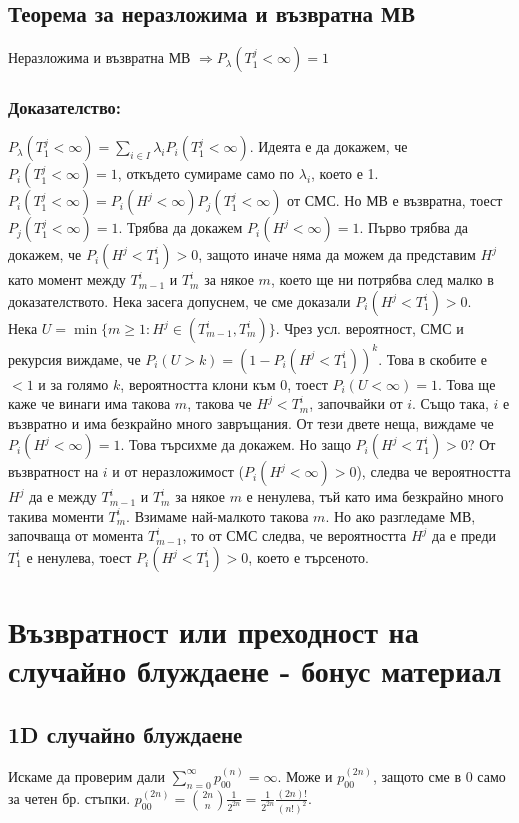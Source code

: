 \documentclass{article}
\begin{document}
\subsection{Теорема за неразложима и възвратна МВ}
Неразложима и възвратна МВ $\Rightarrow P_\lambda(T_1^j < \infty) = 1$

\subsubsection*{Доказателство:}
$P_\lambda(T_1^j < \infty) = \sum_{i \in I} \lambda_i P_i(T_1^j < \infty)$. Идеята е да докажем, че $P_i(T_1^j < \infty) = 1$, откъдето сумираме 
само по $\lambda_i$, което е 1. \\ $P_i(T_1^j < \infty) = P_i(H^j < \infty)P_j(T_1^j < \infty)$ от СМС. Но МВ е възвратна, тоест $P_j(T_1^j < \infty) = 1$. 
Трябва да докажем $P_i(H^j < \infty) = 1$. Първо трябва да докажем, че $P_i(H^j < T_1^i) > 0$, защото иначе 
няма да можем да представим $H^j$ като момент между $T_{m-1}^i$ и $T_m^i$ за някое $m$, което ще ни потрябва 
след малко в доказателството. Нека засега допуснем, че сме доказали $P_i(H^j < T_1^i) > 0$. \\
Нека $U = \min\{m \geq 1 : H^j \in (T_{m-1}^i, T_m^i)\}$. Чрез усл. вероятност, СМС и рекурсия виждаме, че 
$P_i(U > k) = (1 - P_i(H^j < T_1^i))^k$. Това в скобите е $<1$ и за голямо $k$, вероятността клони към 0, тоест $P_i(U < \infty) = 1$. 
Това ще каже че винаги има такова $m$, такова че $H^j < T_m^i$, започвайки от $i$. Също така, $i$ е възвратно 
и има безкрайно много завръщания. От тези двете неща, виждаме че $P_i(H^j < \infty) = 1$. Това търсихме да докажем. 
Но защо $P_i(H^j < T_1^i) > 0$? От възвратност на $i$ и от неразложимост ($P_i(H^j < \infty) > 0$), следва че вероятността 
$H^j$ да е между $T_{m-1}^i$ и $T_m^i$ за някое $m$ е ненулева, тъй като има безкрайно много такива моменти $T_m^i$.  
Взимаме най-малкото такова $m$. Но ако разгледаме МВ, започваща от момента $T_{m-1}^i$, то от СМС следва, 
че вероятността $H^j$ да е преди $T_1^i$ е ненулева, тоест $P_i(H^j < T_1^i) > 0$, което е търсеното.

\section{Възвратност или преходност на случайно блуждаене - бонус материал}

\subsection{1D случайно блуждаене}
Искаме да проверим дали $\sum_{n=0}^\infty p_{00}^{(n)} = \infty$. Може и $p_{00}^{(2n)}$, защото сме 
в 0 само за четен бр. стъпки. $p_{00}^{(2n)} = \binom{2n}{n}\frac{1}{2^{2n}} = \frac{1}{2^{2n}}\frac{(2n)!}{(n!)^2}$. \\
\end{document}
